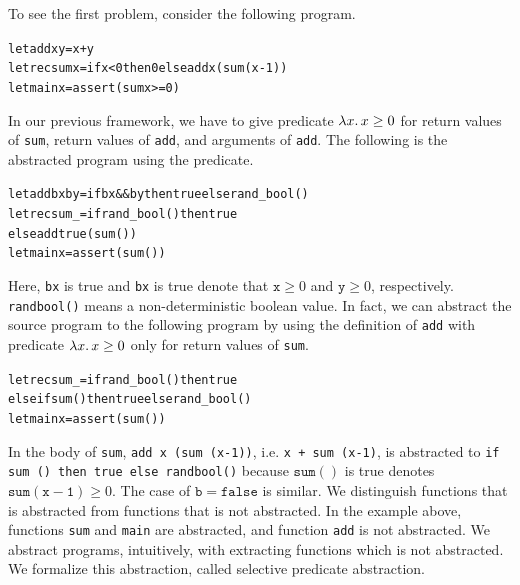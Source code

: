 To see the first problem, consider the following program.
\begin{alltt}
let add x y = x + y
let rec sum x = if x < 0 then 0 else add x (sum (x-1))
let main x = assert (sum x >= 0)
\end{alltt}
In our previous framework, we have to give predicate $\lambda{x}.\,{x\geq0}$
for return values of \texttt{sum}, return values of \texttt{add}, and
arguments of \texttt{add}.  The following is the abstracted program
using the predicate.
\begin{alltt}
let add bx by = if bx \&\& by then true else rand_bool()
let rec sum _ = if rand_bool() then true
                else add true (sum ())
let main x = assert (sum ())
\end{alltt}
Here, \texttt{bx} is true and \texttt{bx} is true denote that
$\mathtt{x} \geq 0$ and $\mathtt{y} \geq 0$, respectively.
\texttt{rand\us{}bool()} means a non-deterministic boolean value.
In fact, we can abstract the source program to the following program by
using the definition of \texttt{add} with predicate $\lambda{x}.\,{x\geq0}$
only for return values of \texttt{sum}.
\begin{alltt}
let rec sum _ = if rand_bool() then true
                else if sum () then true else rand_bool()
let main x = assert (sum ())
\end{alltt}
In the body of \texttt{sum}, \texttt{add x (sum (x-1))}, i.e. \texttt{x
+ sum (x-1)}, is abstracted to \texttt{if sum () then true else rand\us{}bool()}
because $\mathtt{sum ()}$ is true denotes $\mathtt{sum (x-1)} \geq 0$.
The case of $\mathtt{b}=\mathtt{false}$ is similar.
We distinguish functions that is abstracted from functions that is not abstracted.
In the example above, functions \texttt{sum} and \texttt{main} are abstracted, and
function \texttt{add} is not abstracted.
We abstract programs, intuitively, with extracting functions which is not abstracted.
We formalize this abstraction, called selective predicate abstraction.

